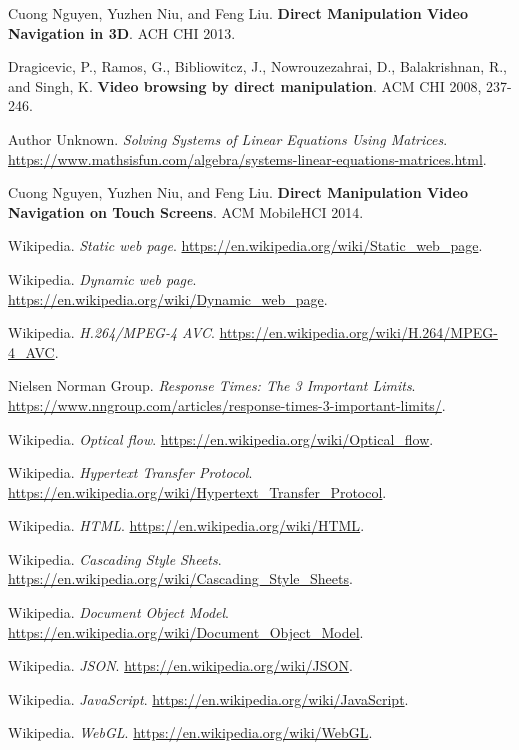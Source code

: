 \begin{thebibliography}{9}

Cuong Nguyen, Yuzhen Niu, and Feng Liu. \textbf{Direct Manipulation Video Navigation in 3D}. ACH CHI 2013.

Dragicevic, P., Ramos, G., Bibliowitcz, J., Nowrouzezahrai, D., Balakrishnan, R., and Singh, K. \textbf{Video browsing by direct manipulation}. ACM CHI 2008, 237-246.

Author Unknown. \textit{Solving Systems of Linear Equations Using Matrices}. \url{https://www.mathsisfun.com/algebra/systems-linear-equations-matrices.html}.

Cuong Nguyen, Yuzhen Niu, and Feng Liu. \textbf{Direct Manipulation Video Navigation on Touch Screens}. ACM MobileHCI 2014.

Wikipedia. \textit{Static web page}. \url{https://en.wikipedia.org/wiki/Static_web_page}.

Wikipedia. \textit{Dynamic web page}. \url{https://en.wikipedia.org/wiki/Dynamic_web_page}.

Wikipedia. \textit{H.264/MPEG-4 AVC}. \url{https://en.wikipedia.org/wiki/H.264/MPEG-4_AVC}.

Nielsen Norman Group. \textit{Response Times: The 3 Important Limits}. \url{https://www.nngroup.com/articles/response-times-3-important-limits/}.

Wikipedia. \textit{Optical flow}. \url{https://en.wikipedia.org/wiki/Optical_flow}.

Wikipedia. \textit{Hypertext Transfer Protocol}. \url{https://en.wikipedia.org/wiki/Hypertext_Transfer_Protocol}.

Wikipedia. \textit{HTML}. \url{https://en.wikipedia.org/wiki/HTML}.

Wikipedia. \textit{Cascading Style Sheets}. \url{https://en.wikipedia.org/wiki/Cascading_Style_Sheets}.

Wikipedia. \textit{Document Object Model}. \url{https://en.wikipedia.org/wiki/Document_Object_Model}.

Wikipedia. \textit{JSON}. \url{https://en.wikipedia.org/wiki/JSON}.

Wikipedia. \textit{JavaScript}. \url{https://en.wikipedia.org/wiki/JavaScript}.

Wikipedia. \textit{WebGL}. \url{https://en.wikipedia.org/wiki/WebGL}.


\end{thebibliography}
